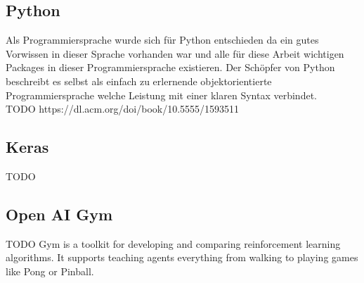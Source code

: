 \subsection{Python}
Als Programmiersprache wurde sich für Python entschieden da ein gutes Vorwissen in dieser Sprache vorhanden war und alle für diese Arbeit wichtigen Packages in dieser Programmiersprache existieren.
Der Schöpfer von Python beschreibt es selbst als einfach zu erlernende objektorientierte Programmiersprache welche Leistung mit einer klaren Syntax verbindet.\\
\colorbox{red!30}{TODO https://dl.acm.org/doi/book/10.5555/1593511}

\subsection{Keras}
\colorbox{red!30}{TODO}
\subsection{Open AI Gym}
\colorbox{red!30}{TODO Gym is a toolkit for developing and comparing reinforcement learning algorithms. It supports teaching agents everything from walking to playing games like Pong or Pinball.}
